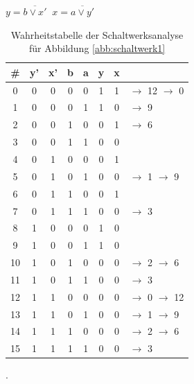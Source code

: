 \documentclass[10pt,a4paper]{scrartcl}
\newcommand{\cmark}{\textcolor{green!80!black}{\ding{51}}}%
\newcommand{\xmark}{\textcolor{red}{\ding{55}}}%
\begin{document}
\begin{table}[h!]
	\centering
	$y = \overline{b \vee x'} \;\; x = \overline{a \vee y'}$
	\\[1em]
	\begin{tabular}{c|cc|cc|cc|l}
		\# & y'  & x'  & b & a & y & x & \\ \hline
		0 & 0 & 0 & 0 & 0 & 1 & 1 & \xmark $\rightarrow$ 12 $\rightarrow$ 0 \textcolor{red}{\lightning}\\
		1 & 0 & 0 & 0 & 1 & 1 & 0 & \xmark $\rightarrow$ 9 \cmark \\
		2 & 0 & 0 & 1 & 0 & 0 & 1 & \xmark $\rightarrow$ 6 \cmark\\
		3 & 0 & 0 & 1 & 1 & 0 & 0 & \cmark \\ \cline{2-3}
		4 & 0 & 1 & 0 & 0 & 0 & 1 & \cmark\\
		5 & 0 & 1 & 0 & 1 & 0 & 0 & \xmark $\rightarrow$ 1 $\rightarrow$ 9 \cmark\\
		6 & 0 & 1 & 1 & 0 & 0 & 1 & \cmark\\
		7 & 0 & 1 & 1 & 1 & 0 & 0 & \xmark $\rightarrow$ 3 \cmark\\ \cline{2-3}
		8 & 1 & 0 & 0 & 0 & 1 & 0 & \cmark\\
		9 & 1 & 0 & 0 & 1 & 1 & 0 & \cmark\\
		10 & 1 & 0 & 1 & 0 & 0 & 0 & \xmark $\rightarrow$ 2 $\rightarrow$ 6 \cmark\\
		11 & 1 & 0 & 1 & 1 & 0 & 0 & \xmark $\rightarrow$ 3 \cmark\\ \cline{2-3}
		12 & 1 & 1 & 0 & 0 & 0 & 0 & \xmark $\rightarrow$ 0 $\rightarrow$ 12 \textcolor{red}{\lightning}\\
		13 & 1 & 1 & 0 & 1 & 0 & 0 & \xmark $\rightarrow$ 1 $\rightarrow$ 9 \cmark\\
		14 & 1 & 1 & 1 & 0 & 0 & 0 & \xmark $\rightarrow$ 2 $\rightarrow$ 6 \cmark\\
		15 & 1 & 1 & 1 & 1 & 0 & 0 & \xmark $\rightarrow$ 3 \cmark\\
	\end{tabular}
\caption{Wahrheitstabelle der Schaltwerksanalyse für Abbildung \ref{abb:schaltwerk1}}.
\end{table}
\end{document}
